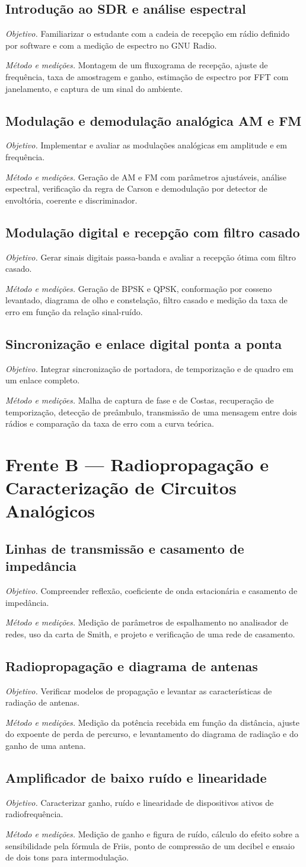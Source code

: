 \documentclass[11pt,a4paper]{article}
\newcommand{\pratica}[3]{%
  \subsection{#1}
  \textit{Objetivo.} #2

  \textit{Método e medições.} #3
  \vspace{0.3em}
}
\begin{document}
\pratica{Introdução ao SDR e análise espectral}
{Familiarizar o estudante com a cadeia de recepção em rádio definido por software e com a medição de espectro no GNU Radio.}
{Montagem de um fluxograma de recepção, ajuste de frequência, taxa de amostragem e ganho, estimação de espectro por FFT com janelamento, e captura de um sinal do ambiente.}

\pratica{Modulação e demodulação analógica AM e FM}
{Implementar e avaliar as modulações analógicas em amplitude e em frequência.}
{Geração de AM e FM com parâmetros ajustáveis, análise espectral, verificação da regra de Carson e demodulação por detector de envoltória, coerente e discriminador.}

\pratica{Modulação digital e recepção com filtro casado}
{Gerar sinais digitais passa-banda e avaliar a recepção ótima com filtro casado.}
{Geração de BPSK e QPSK, conformação por cosseno levantado, diagrama de olho e constelação, filtro casado e medição da taxa de erro em função da relação sinal-ruído.}

\pratica{Sincronização e enlace digital ponta a ponta}
{Integrar sincronização de portadora, de temporização e de quadro em um enlace completo.}
{Malha de captura de fase e de Costas, recuperação de temporização, detecção de preâmbulo, transmissão de uma mensagem entre dois rádios e comparação da taxa de erro com a curva teórica.}

\section{Frente B --- Radiopropagação e Caracterização de Circuitos Analógicos}

\pratica{Linhas de transmissão e casamento de impedância}
{Compreender reflexão, coeficiente de onda estacionária e casamento de impedância.}
{Medição de parâmetros de espalhamento no analisador de redes, uso da carta de Smith, e projeto e verificação de uma rede de casamento.}

\pratica{Radiopropagação e diagrama de antenas}
{Verificar modelos de propagação e levantar as características de radiação de antenas.}
{Medição da potência recebida em função da distância, ajuste do expoente de perda de percurso, e levantamento do diagrama de radiação e do ganho de uma antena.}

\pratica{Amplificador de baixo ruído e linearidade}
{Caracterizar ganho, ruído e linearidade de dispositivos ativos de radiofrequência.}
{Medição de ganho e figura de ruído, cálculo do efeito sobre a sensibilidade pela fórmula de Friis, ponto de compressão de um decibel e ensaio de dois tons para intermodulação.}
\end{document}
